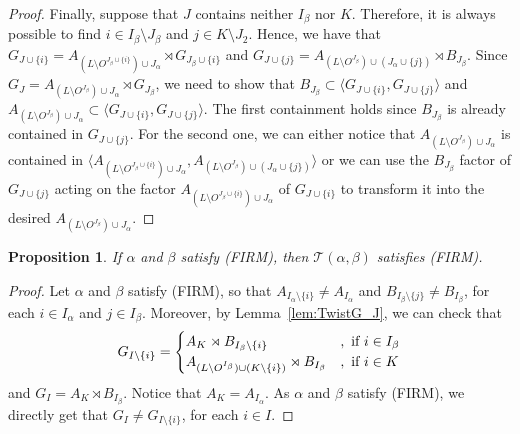 \documentclass[11pt,letterpaper]{amsart}
\newtheorem{prop}{Proposition}[section]
\newcommand{\TT}{\mathcal{T}}
\begin{document}
\begin{proof}
    Finally, suppose that $J$ contains neither $I_\beta$ nor $K$. Therefore, it is always possible to find $i \in I_\beta \setminus J_\beta$ and $j \in K \setminus J_2$. Hence, we have that $G_{J \cup \{i\}} = A_{(L\setminus O^{J_\beta \cup \{i\}}) \cup J_\alpha}\rtimes G_{J_\beta \cup \{i\}}$ and $G_{J \cup \{j\}} = A_{(L\setminus O^{J_\beta}) \cup (J_\alpha \cup \{j\})}\rtimes B_{J_\beta}$. Since $G_J = A_{(L\setminus O^{J_\beta}) \cup J_\alpha}\rtimes G_{J_\beta}$, we need to show that $B_{J_\beta} \subset \langle G_{J \cup \{i\}}, G_{J \cup \{j\}} \rangle$ and $A_{(L\setminus O^{J_\beta}) \cup J_\alpha} \subset \langle G_{J \cup \{i\}}, G_{J \cup \{j\}} \rangle$. The first containment holds since $B_{J_\beta}$ is already contained in $G_{J \cup \{j\}}$. For the second one, we can either notice that $A_{(L\setminus O^{J_\beta}) \cup J_\alpha}$ is contained in $\langle A_{(L\setminus O^{J_\beta \cup \{i\}}) \cup J_\alpha} ,A_{(L\setminus O^{J_\beta}) \cup (J_\alpha \cup \{j\})} \rangle$ or we can use the $B_{J_\beta}$ factor of $G_{J \cup \{j\}}$ acting on the factor $A_{(L \setminus O^{J_\beta \cup \{i\}}) \cup J_\alpha}$ of $G_{J \cup \{i\}}$ to transform it into the desired $A_{(L\setminus O^{J_\beta}) \cup J_\alpha}$.

\end{proof}

\begin{prop}\label{prop:GammaLambFIRM-TwistFIRM}
    If $\alpha$ and $\beta$ satisfy (FIRM), then $\TT(\alpha,\beta)$ satisfies (FIRM).
\end{prop}
\begin{proof}
    Let $\alpha$ and $\beta$ satisfy (FIRM), so that $A_{I_\alpha\setminus \{i\}} \neq A_{I_\alpha}$ and $B_{I_\beta\setminus\{j\}}\neq B_{I_\beta}$, for each $i\in I_\alpha$ and $j\in I_\beta$.
    Moreover, by Lemma~\ref{lem:TwistG_J}, we can check that
    \begin{equation*}
        G_{I\setminus\{i\}} =
        \begin{cases}
            A_K\rtimes B_{I_\beta\setminus\{i\}} &, \textnormal{ if } i\in I_\beta \\
            A_{(L\setminus O^{I_\beta})\cup (K\setminus\{i\})}\rtimes B_{I_\beta}&, \textnormal{ if } i\in K
        \end{cases}
    \end{equation*}
    and $G_{I}=A_K\rtimes B_{I_\beta}$. Notice that $A_K = A_{I_\alpha}$.
    As $\alpha$ and $\beta$ satisfy (FIRM), we directly get that $G_{I}\neq G_{I\setminus\{i\}}$, for each $i\in I$.
\end{proof}
\end{document}
